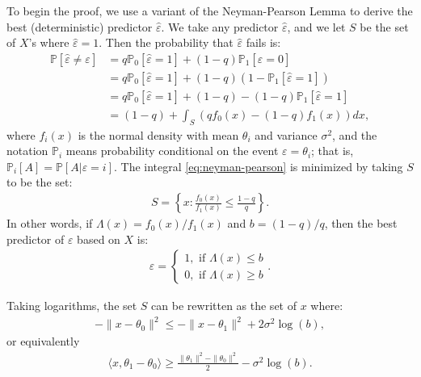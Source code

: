 \documentclass{article}
\theoremstyle{thm}
\theoremstyle{definition}
\newcommand{\ep}{\varepsilon}
\newcommand{\1}{\mathbf{1}}
\renewcommand{\P}{\mathbb{P}}
\begin{document}
To begin the proof, we use a variant of the Neyman-Pearson Lemma to derive the best (deterministic) predictor $\hat{\ep}$. We take any predictor $\hat{\ep}$, and we let $S$ be the set of $X$'s where $\hat{\ep} = 1$. Then the probability that $\hat{\ep}$ fails is:
%
\begin{align}
\label{eq:neyman-pearson}
%
\P[\hat{\ep} \ne \ep] 
&= q \P_0[\hat{\ep} = 1 ] + (1-q) \P_1[\hat{\ep} = 0]
    \nonumber \\
&= q \P_0[\hat{\ep} = 1] + (1-q) (1 - \P_1[\hat{\ep} = 1])
    \nonumber \\
&= q \P_0[\hat{\ep} = 1] + (1-q) - (1-q) \P_1[\hat{\ep} = 1]
    \nonumber \\
&= (1-q)  + \int_S (q f_0(x) - (1-q) f_1(x))dx,
%
\end{align}
%
where $f_i(x)$ is the normal density with mean $\theta_i$ and variance $\sigma^2$, and the notation $\P_i$ means probability conditional on the event $\ep = \theta_i$; that is, $\P_i[A] = \P[A | \ep=i]$. The integral \eqref{eq:neyman-pearson} is minimized by taking $S$ to be the set:
%
\begin{align}
%
S = \left\{x : \frac{f_0(x)}{f_1(x)} \le \frac{1-q}{q} \right\}.
%
\end{align}
%
In other words, if $\Lambda(x) = f_0(x) / f_1(x)$ and $b = (1-q) / q$, then the best predictor of $\ep$ based on $X$ is:
%
\begin{align}
%
\ep = 
\begin{cases}
1,  \text{ if } \Lambda(x) \le b \\
0,  \text{ if } \Lambda(x) \ge b
\end{cases}.
%
\end{align}

Taking logarithms, the set $S$ can be rewritten as the set of $x$ where:
\begin{align}
%
-\| x - \theta_0\|^2 \le - \|x - \theta_1\|^2 + 2 \sigma^2 \log(b),
%
\end{align}
%
or equivalently
%
\begin{align}
%
\langle x , \theta_1 - \theta_0 \rangle 
    \ge \frac{\|\theta_1\|^2 - \|\theta_0\|^2}{2} - \sigma^2 \log(b).
%
\end{align}
%
\end{document}
